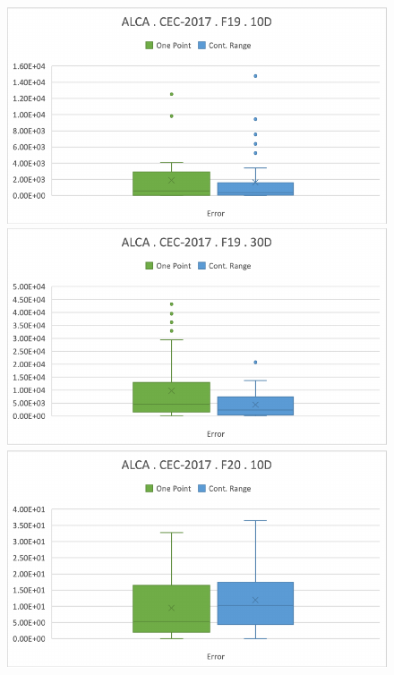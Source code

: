\documentclass[graybox]{svmult}
\begin{document}
\begin{figure}[!ht]
\begin{minipage}[h]{0.49\linewidth}
        \end{minipage}
        \vfill
        \vspace{0.05 cm}    
        \begin{minipage}[h]{0.49\linewidth}
            \includegraphics[width=1\linewidth]{img/fig_experiment_F19x10D.pdf} 
        \end{minipage}
        \hfill
        \begin{minipage}[h]{0.49\linewidth}
            \includegraphics[width=1\linewidth]{img/fig_experiment_F19x30D.pdf} 
        \end{minipage}
        \vfill
        \vspace{0.05 cm}
        \begin{minipage}[h]{0.49\linewidth}
            \includegraphics[width=1\linewidth]{img/fig_experiment_F20x10D.pdf} 

\end{minipage}
\end{figure}
\end{document}
